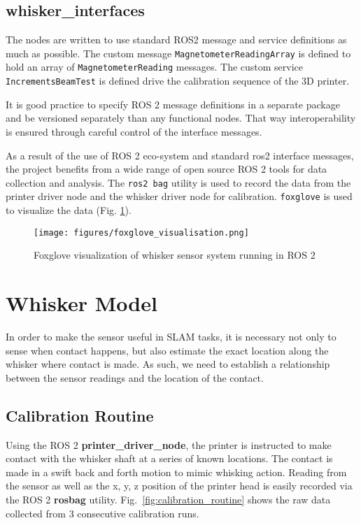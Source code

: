 \documentclass{report}
\begin{document}
\subsection{whisker\_interfaces}

The nodes are written to use standard ROS2 message and service definitions as much as possible. The custom message \verb|MagnetometerReadingArray| is defined to hold an array of \verb|MagnetometerReading| messages. The custom service \verb|IncrementsBeamTest| is defined drive the calibration sequence of the 3D printer.

It is good practice to specify ROS 2 message definitions in a separate package and be versioned separately than any functional nodes. That way interoperability is ensured through careful control of the interface messages.

As a result of the use of ROS 2 eco-system and standard ros2 interface messages, the project benefits from a wide range of open source ROS 2 tools for data collection and analysis. The \verb|ros2 bag| utility is used to record the data from the printer driver node and the whisker driver node for calibration. \verb|foxglove| is used to visualize the data (Fig. \ref{fig:foxglove}).

\begin{figure}[H]
    \centering
    \texttt{[image: figures/foxglove\_visualisation.png]}
    \caption{Foxglove visualization of whisker sensor system running in ROS 2}
    \label{fig:foxglove}
\end{figure}

\section{Whisker Model}

In order to make the sensor useful in SLAM tasks, it is necessary not  only to sense when contact happens, but also estimate the exact location along the whisker where contact is made. As such, we need to establish a relationship between the sensor readings and the location of the contact.

\subsection{Calibration Routine}

Using the ROS 2 \textbf{printer\_driver\_node}, the printer is instructed to make contact with the whisker shaft at a series of known locations. The contact is made in a swift back and forth motion to mimic whisking action. Reading from the sensor as well as the x, y, z position of the printer head is easily recorded via the ROS 2 \textbf{rosbag} utility. Fig.~\ref{fig:calibration_routine} shows the raw data collected from 3 consecutive calibration runs.
\end{document}
